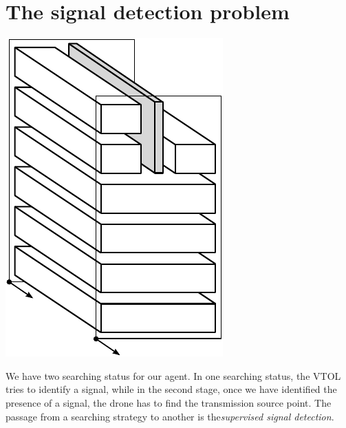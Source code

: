 \section{The signal detection problem}
\begin{marginfigure}
	\centering
	\includegraphics[scale=0.5]{ch3/img/PA_map_radar.pdf}
\end{marginfigure}
We have two searching status for our agent. In one searching status, the VTOL tries to identify a signal, while in the second stage, once we have identified the presence of a signal, the drone has to find the transmission source point. The passage from a searching strategy to another is the\emph{supervised signal detection}.

